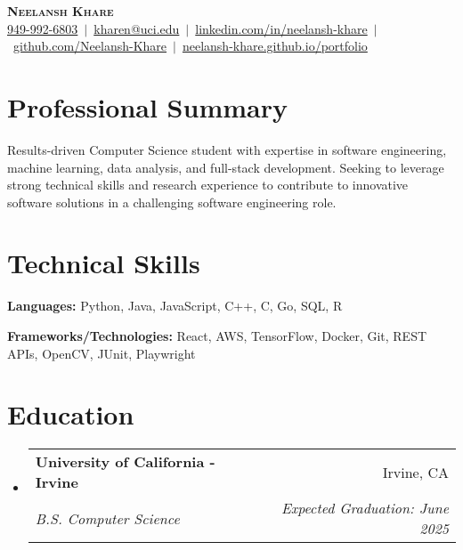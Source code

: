 \documentclass[letterpaper,11pt]{article}
\makeatletter
\newcommand{\resumeSubheading}[4]{
  \vspace{-2pt}\item
    \begin{tabular*}{0.97\textwidth}[t]{l@{\extracolsep{\fill}}r}
      \textbf{#1} & #2 \\
      \textit{\small#3} & \textit{\small #4} \\
    \end{tabular*}\vspace{-5pt}
}
\newcommand{\resumeSubHeadingListStart}{\begin{itemize}[leftmargin=0.15in, label={}]}
\newcommand{\resumeSubHeadingListEnd}{\end{itemize}}
\makeatother
\begin{document}
\begin{center}  
  \textbf{\Large \scshape Neelansh Khare} \\ \vspace{1pt}
  \color{blue}
  \small \href{tel:19499926803}{{949-992-6803}}~$|$~\href{mailto:kharen@uci.edu}{{kharen@uci.edu}}~$|$~\href{https://linkedin.com/in/neelansh-khare}{{linkedin.com/in/neelansh-khare}}~$|$~\href{https://github.com/Neelansh-Khare}{{github.com/Neelansh-Khare}}~$|$~\href{https://neelansh-khare.github.io/portfolio/}{{neelansh-khare.github.io/portfolio}}
\end{center}

\section{Professional Summary}
\begin{itemize}[leftmargin=0.15in, label={}, itemsep=0pt]
\small{\item{
  Results-driven Computer Science student with expertise in software engineering, machine learning, data analysis, and full-stack development. Seeking to leverage strong technical skills and research experience to contribute to innovative software solutions in a challenging software engineering role.
}}
\end{itemize}

\section{Technical Skills}
\begin{itemize}[leftmargin=0.15in, label={}, itemsep=0pt]
\small{\item{
 \textbf{Languages:} Python, Java, JavaScript, C++, C, Go, SQL, R
}}
\small{\item{
 \textbf{Frameworks/Technologies:} React, AWS, TensorFlow, Docker, Git, REST APIs, OpenCV, JUnit, Playwright
}}
\end{itemize}

\section{Education}
  \resumeSubHeadingListStart
    \resumeSubheading
      {University of California - Irvine}{Irvine, CA}
      {B.S. Computer Science}{Expected Graduation: June 2025}
  \resumeSubHeadingListEnd
  
\end{document}

